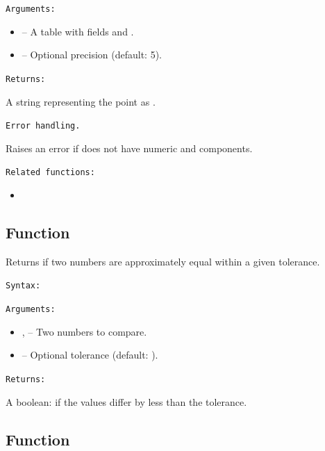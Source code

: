 \medskip
\texttt{Arguments: }

\begin{itemize}
\item {} – A table with fields  and .
\item {} – Optional precision (default: 5).
\end{itemize}

\medskip
\texttt{Returns: }

A string representing the point as .

\medskip
\texttt{Error handling.}

Raises an error if  does not have numeric  and  components.

\medskip
\texttt{Related functions: }

\begin{itemize}
\item {}
\end{itemize}

\subsection{Function }
\label{sub:function_utils_almost_equal}

Returns  if two numbers are approximately equal within a given tolerance.

\medskip
\texttt{Syntax: }

\begin{center}
\end{center}

\medskip
\texttt{Arguments: }

\begin{itemize}
\item {},  – Two numbers to compare.
\item {} – Optional tolerance (default: ).
\end{itemize}

\medskip
\texttt{Returns: }

A boolean:  if the values differ by less than the tolerance.



\subsection{Function }
\label{sub:function_utils_clamp}

